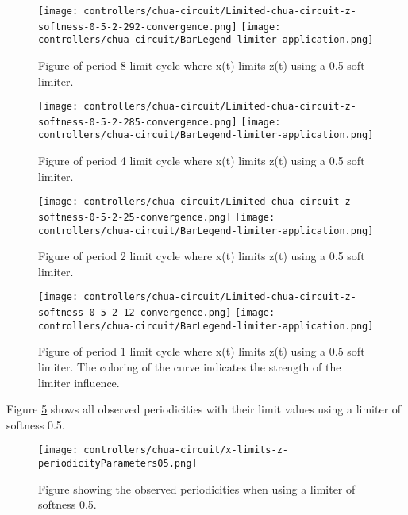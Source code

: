 \documentclass[main]{subfiles}
\begin{document}
\begin{figure}[H]
\centering
\texttt{[image: controllers/chua-circuit/Limited-chua-circuit-z-softness-0-5-2-292-convergence.png]}
\texttt{[image: controllers/chua-circuit/BarLegend-limiter-application.png]}
\caption[Figure of period 8 limit cycle using a 0.5 soft limiter.]{Figure of period 8 limit cycle where x(t) limits z(t) using a 0.5 soft limiter.}
\label{figure:z-0.5-8-limit-cycle-trajectory}
\end{figure}

\begin{figure}[H]
\centering
\texttt{[image: controllers/chua-circuit/Limited-chua-circuit-z-softness-0-5-2-285-convergence.png]}
\texttt{[image: controllers/chua-circuit/BarLegend-limiter-application.png]}
\caption[Figure of period 4 limit cycle using a 0.5 soft limiter.]{Figure of period 4 limit cycle where x(t) limits z(t) using a 0.5 soft limiter.}
\label{figure:z-0.5-4-limit-cycle-trajectory}
\end{figure}

\begin{figure}[H]
\centering
\texttt{[image: controllers/chua-circuit/Limited-chua-circuit-z-softness-0-5-2-25-convergence.png]}
\texttt{[image: controllers/chua-circuit/BarLegend-limiter-application.png]}
\caption[Figure of period 2 limit cycle using a 0.5 soft limiter.]{Figure of period 2 limit cycle where x(t) limits z(t) using a 0.5 soft limiter.}
\label{figure:z-0.5-2-limit-cycle-trajectory}
\end{figure}

\begin{figure}[H]
\centering
\texttt{[image: controllers/chua-circuit/Limited-chua-circuit-z-softness-0-5-2-12-convergence.png]}
\texttt{[image: controllers/chua-circuit/BarLegend-limiter-application.png]}
\caption[Figure of period 1 limit cycle using a 0.5 soft limiter.]{Figure of period 1 limit cycle where x(t) limits z(t) using a 0.5 soft limiter. The coloring of the curve indicates the strength of the limiter influence.}
\label{figure:z-0.5-1-limit-cycle-trajectory}
\end{figure}

Figure \ref{figure:x-limits-z-periodicityParameters05} shows all observed periodicities with their limit values using a limiter of softness 0.5. 
\begin{figure}[H]
\centering
\texttt{[image: controllers/chua-circuit/x-limits-z-periodicityParameters05.png]}
\caption[Figure of observed periodicities with a x-limiting z 0.5 limiter]{Figure showing the observed periodicities when using a limiter of softness 0.5.}
\label{figure:x-limits-z-periodicityParameters05}
\end{figure}
\end{document}
